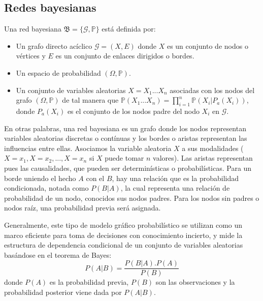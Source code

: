 \subsection{Redes bayesianas}
\begin{definicion}\label{def:BN}
Una red bayesiana\cite{def-bncn} $\mathfrak{B} = \lbrace \mathcal{G}, \mathbb{P} \rbrace$ está definida por:
\begin{itemize}
    \item Un grafo directo acíclico $\mathcal{G}=(X,E)$ donde $X$ es un conjunto de nodos o vértices y $E$ 
    es un conjunto de enlaces dirigidos o bordes.
    \item Un espacio de probabilidad $(\Omega, \mathbb{P})$.
    \item Un conjunto de variables aleatorias $X={X_1...X_n}$ asociadas con los nodos del grafo $(\Omega, \mathbb{P})$ 
    de tal manera que $\mathbb{P}(X_1...X_n)= \prod_{i=1}^{n}\mathbb{P}(X_i|P_a(X_i))$, donde $P_a(X_i)$ es el 
    conjunto de los nodos padre del nodo $X_i$ en $\mathcal{G}$.  
\end{itemize}
\end{definicion}

En otras palabras, una red bayesiana es un grafo donde los nodos representan variables aleatorias discretas o contínuas 
y los bordes o aristas representan las influencias entre ellas. Asociamos la variable aleatoria $X$ a sus modalidades 
($X=x_1, X=x_2,..., X=x_n$ si $X$ puede tomar $n$ valores). Las aristas representan pues las causalidades, que pueden ser determinísticas 
o probabilísticas. Para un borde uniendo el hecho $A$ con el $B$, hay una relación que es la probabilidad condicionada, notada como $P(B|A)$, 
la cual representa una relación de probabilidad de un nodo, conocidos sus nodos padres. Para los nodos sin padres o nodos raíz, una probabilidad 
previa será asignada.

Generalmente, este tipo de modelo gráfico probabilístico se utilizan como un marco eficiente para
toma de decisiones con conocimiento incierto, y mide la estructura de dependencia condicional
de un conjunto de variables aleatorias basándose en el teorema de Bayes:\\
\begin{equation}
\label{eq:bayes}
P(A|B) = \frac{P(B|A).P(A)}{P(B)}
\end{equation}
donde $P(A)$ es la probabilidad previa, $P(B)$ son las observaciones y la probabilidad posterior viene dada 
por $P(A|B)$.

